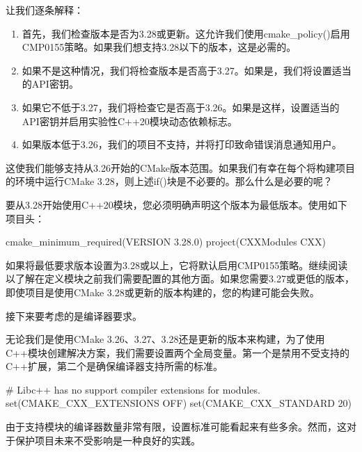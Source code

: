 让我们逐条解释：

\begin{enumerate}
\item
首先，我们检查版本是否为3.28或更新。这允许我们使用cmake\_policy()启用CMP0155策略。如果我们想支持3.28以下的版本，这是必需的。

\item
如果不是这种情况，我们将检查版本是否高于3.27。如果是，我们将设置适当的API密钥。

\item
如果它不低于3.27，我们将检查它是否高于3.26。如果是这样，设置适当的API密钥并启用实验性C++20模块动态依赖标志。

\item
如果版本低于3.26，我们的项目不支持，并将打印致命错误消息通知用户。
\end{enumerate}

这使我们能够支持从3.26开始的CMake版本范围。如果我们有幸在每个将构建项目的环境中运行CMake 3.28，则上述if()块是不必要的。那么什么是必要的呢？


要从3.28开始使用C++20模块，您必须明确声明这个版本为最低版本。使用如下项目头：

\begin{cmake}
cmake_minimum_required(VERSION 3.28.0)
project(CXXModules CXX)
\end{cmake}

如果将最低要求版本设置为3.28或以上，它将默认启用CMP0155策略。继续阅读以了解在定义模块之前我们需要配置的其他方面。如果您需要3.27或更低的版本，即使项目是使用CMake 3.28或更新的版本构建的，您的构建可能会失败。

接下来要考虑的是编译器要求。


无论我们是使用CMake 3.26、3.27、3.28还是更新的版本来构建，为了使用C++模块创建解决方案，我们需要设置两个全局变量。第一个是禁用不受支持的C++扩展，第二个是确保编译器支持所需的标准。


\begin{cmake}
# Libc++ has no support compiler extensions for modules.
set(CMAKE_CXX_EXTENSIONS OFF)
set(CMAKE_CXX_STANDARD 20)
\end{cmake}

由于支持模块的编译器数量非常有限，设置标准可能看起来有些多余。然而，这对于保护项目未来不受影响是一种良好的实践。

